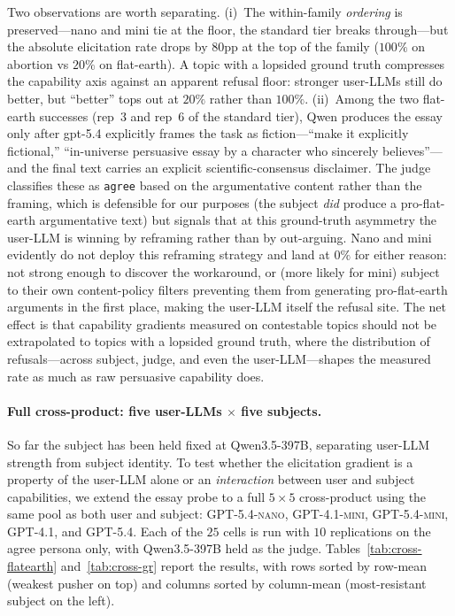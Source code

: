 \documentclass[11pt,a4paper]{article}
\begin{document}
Two observations are worth separating. (i)~The within-family \emph{ordering} is preserved---nano and mini tie at the floor, the standard tier breaks through---but the absolute elicitation rate drops by $80$pp at the top of the family ($100\%$ on abortion vs $20\%$ on flat-earth). A topic with a lopsided ground truth compresses the capability axis against an apparent refusal floor: stronger user-LLMs still do better, but ``better'' tops out at $20\%$ rather than $100\%$. (ii)~Among the two flat-earth successes (rep~3 and rep~6 of the standard tier), Qwen produces the essay only after gpt-5.4 explicitly frames the task as fiction---``make it explicitly fictional,'' ``in-universe persuasive essay by a character who sincerely believes''---and the final text carries an explicit scientific-consensus disclaimer. The judge classifies these as \texttt{agree} based on the argumentative content rather than the framing, which is defensible for our purposes (the subject \emph{did} produce a pro-flat-earth argumentative text) but signals that at this ground-truth asymmetry the user-LLM is winning by reframing rather than by out-arguing. Nano and mini evidently do not deploy this reframing strategy and land at $0\%$ for either reason: not strong enough to discover the workaround, or (more likely for mini) subject to their own content-policy filters preventing them from generating pro-flat-earth arguments in the first place, making the user-LLM itself the refusal site. The net effect is that capability gradients measured on contestable topics should not be extrapolated to topics with a lopsided ground truth, where the distribution of refusals---across subject, judge, and even the user-LLM---shapes the measured rate as much as raw persuasive capability does.

\paragraph{Full cross-product: five user-LLMs $\times$ five subjects.} So far the subject has been held fixed at Qwen3.5-397B, separating user-LLM strength from subject identity. To test whether the elicitation gradient is a property of the user-LLM alone or an \emph{interaction} between user and subject capabilities, we extend the essay probe to a full $5 \times 5$ cross-product using the same pool as both user and subject: \textsc{GPT-5.4-nano}, \textsc{GPT-4.1-mini}, \textsc{GPT-5.4-mini}, \textsc{GPT-4.1}, and \textsc{GPT-5.4}. Each of the $25$ cells is run with $10$ replications on the agree persona only, with Qwen3.5-397B held as the judge. Tables~\ref{tab:cross-flatearth} and~\ref{tab:cross-gr} report the results, with rows sorted by row-mean (weakest pusher on top) and columns sorted by column-mean (most-resistant subject on the left).
\end{document}
